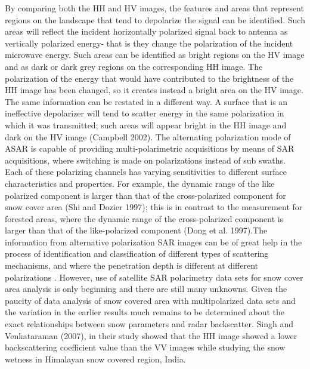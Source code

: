By comparing both the HH and HV images, the features and areas that represent regions on the landscape that tend to depolarize the signal can be identified. Such areas will reflect the incident horizontally polarized signal back to antenna as vertically polarized energy- that is they change the polarization of the incident microwave energy. Such areas can be identified as bright regions on the HV image and as dark or dark grey regions on the corresponding HH image. The polarization of the energy that would have contributed to the brightness of the HH image has been changed, so it creates instead a bright area on the HV image. The same information can be restated in a different way. A surface that is an ineffective depolarizer will tend to scatter energy in the same polarization in which it was transmitted; such areas will appear bright in the HH image and dark on the HV image (Campbell 2002). The alternating polarization mode of ASAR is capable of providing multi-polarimetric acquisitions by means of SAR acquisitions, where switching is made on polarizations instead of sub swaths. Each of these polarizing channels has varying sensitivities to different surface characteristics and properties. For example, the dynamic range of the like polarized component is larger than that of the cross-polarized component for snow cover area (Shi and Dozier 1997); this is in contrast to the measurement for forested areas, where the dynamic range of the cross-polarized component is larger than that of the like-polarized component (Dong et al. 1997).The information from alternative polarization SAR images can be of great help in the process of identification and classification of different types of scattering mechanisms, and where the penetration depth is different at different polarizations . However, use of satellite SAR polarimetry data sets for snow cover area analysis is only beginning and there are still many unknowns. Given the paucity of data analysis of snow covered area with multipolarized data sets and the variation in the earlier results much remains to be determined about the exact relationships between snow parameters and radar backscatter. Singh and Venkataraman (2007), in their study showed that the HH image showed a lower backscattering coefficient value than the VV images while studying the snow wetness in Himalayan snow covered region, India. 
